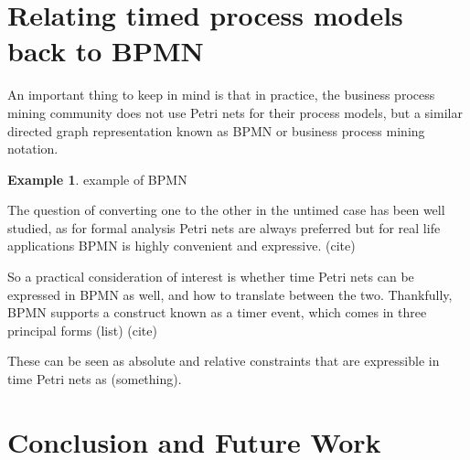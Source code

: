 \documentclass{article}
\theoremstyle{Definition}
\theoremstyle{definition}
\newtheorem{example}{Example}
\begin{document}
%			
%			
%			
%			
%			
%			

	\section{Relating timed process models back to BPMN} 
	
	An important thing to keep in mind is that in practice, the business process mining community does not use Petri nets for their process models, but a similar directed graph representation known as BPMN or business process mining notation. 
	
	\begin{example}
		example of BPMN
	\end{example}

	The question of converting one to the other in the untimed case has been well studied, as for formal analysis Petri nets are always preferred but for real life applications BPMN is highly convenient and expressive. (cite)
	
	So a practical consideration of interest is whether time Petri nets can be expressed in BPMN as well, and how to translate between the two. 
	Thankfully, BPMN supports a construct known as a timer event, which comes in three principal forms 
	(list) (cite)
	
	These can be seen as absolute and relative constraints that are expressible in time Petri nets as (something). 
	
	\section{Conclusion and Future Work}
	
	\clearpage
	

	
	
	
	
\end{document}
